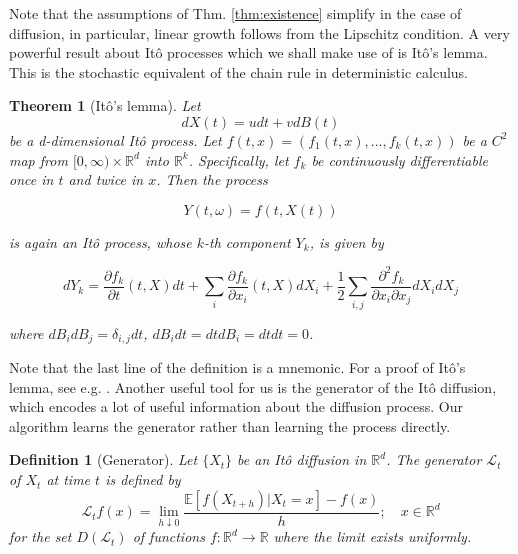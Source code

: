 \documentclass[12pt]{article}
\theoremstyle{break}
\newtheorem{definition}{Definition}[section]
\newtheorem{theorem}{Theorem}[section]
\begin{document}
Note that the assumptions of Thm. \ref{thm:existence} simplify in the case of diffusion, in particular, linear growth follows from the Lipschitz condition. A very powerful result about Itô processes which we shall make use of is Itô's lemma. This is the stochastic equivalent of the chain rule in deterministic calculus.

\begin{theorem}[Itô's lemma]
	Let
	\begin{equation*}
		dX(t) = u dt + v dB(t)
	\end{equation*}
	be a d-dimensional Itô process. Let $f(t, x) = (f_1(t, x), \ldots, f_k(t, x))$ be a $C^2$ map from $[0,\infty) \times \mathbb{R}^d$ into $\mathbb{R}^k$. Specifically, let $f_k$ be continuously differentiable once in $t$ and twice in $x$. Then the process

	\begin{equation*}
		Y(t, \omega) = f(t, X(t))
	\end{equation*}

	is again an Itô process, whose $k$-th component $Y_k$, is given by

	\begin{equation*}
		dY_k = \frac{\partial f_k}{\partial t}(t,X)dt + \sum_{i}\frac{\partial f_k}{\partial x_i}(t, X)dX_i + \frac{1}{2}\sum_{i,j}\frac{\partial^2f_k}{\partial x_i \partial x_j} dX_i dX_j
	\end{equation*}

	where $dB_i dB_j = \delta_{i,j}dt$, $dB_idt = dtdB_i = dtdt = 0$. 
	
\end{theorem}

Note that the last line of the definition is a mnemonic. For a proof of Itô's lemma, see e.g. \cite{oksendal2013}. Another useful tool for us is the generator of the Itô diffusion, which encodes a lot of useful information about the diffusion process. Our algorithm learns the generator rather than learning the process directly.

\begin{definition}[Generator]
	Let $\{X_t\}$ be an Itô diffusion in $\mathbb{R}^d$. The generator $\mathcal{L}_t$ of $X_t$ at time $t$ is defined by
	\begin{equation*}
		\mathcal{L}_tf(x) = \lim_{h \downarrow 0}\frac{\mathbb{E}[f(X_{t+h})|X_t = x] - f(x)}{h}; \quad x \in \mathbb{R}^d
	\end{equation*}
	for the set $D(\mathcal{L}_t)$ of functions $f:\mathbb{R}^d \to \mathbb{R}$ where the limit exists uniformly.
\end{definition}
\end{document}
